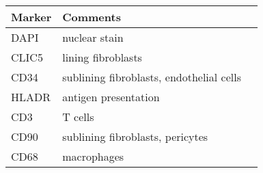 \begin{tabular}{lll}
\toprule
\bfseries Marker & \bfseries Comments &  \\
\midrule
DAPI & nuclear stain &  \\
CLIC5 & lining fibroblasts &  \\
CD34 & sublining fibroblasts, endothelial cells &  \\
HLADR & antigen presentation &  \\
CD3 & T cells &  \\
CD90 & sublining fibroblasts, pericytes &  \\
CD68 & macrophages &  \\
\bottomrule
\end{tabular}
